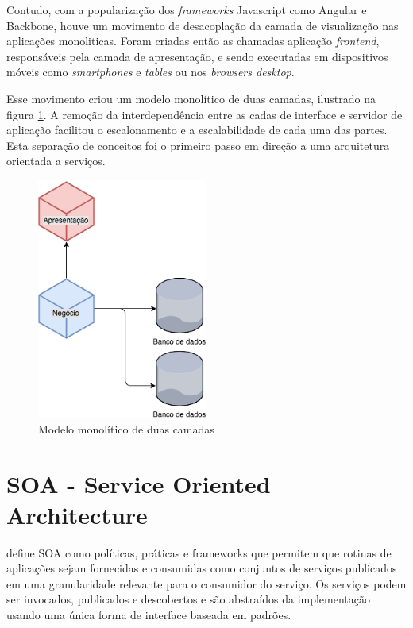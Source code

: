 Contudo, com a popularização dos \textit{frameworks} Javascript como Angular e Backbone, houve um movimento de desacoplação da camada de visualização nas aplicações monoliticas. Foram criadas então as chamadas aplicação \textit{frontend}, responsáveis pela camada de apresentação, e sendo executadas em dispositivos móveis como \textit{smartphones} e \textit{tables} ou nos \textit{browsers desktop}. 

Esse movimento criou um modelo monolítico de duas camadas, ilustrado na figura \ref{fig:two-tier-monolithic}. A remoção da interdependência entre as cadas de interface e servidor de aplicação facilitou o escalonamento e a escalabilidade de cada uma das partes. Esta separação de conceitos foi o primeiro passo em direção a uma arquitetura orientada a serviços.

\begin{figure}[ht]
    \centering
    \includegraphics[width=0.5\textwidth]{figuras/two-tier-monolithic.png}
    \caption{Modelo monolítico de duas camadas}
    \label{fig:two-tier-monolithic}
\end{figure}

\section{SOA - Service Oriented Architecture}\label{sec:soa}

 define SOA como políticas, práticas e frameworks que permitem que rotinas de aplicações sejam fornecidas e consumidas como conjuntos de serviços publicados em uma granularidade relevante para o consumidor do serviço. Os serviços podem ser invocados, publicados e descobertos e são abstraídos da implementação usando uma única forma de interface baseada em padrões.

